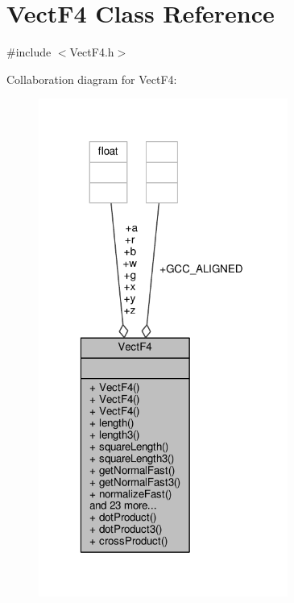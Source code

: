 \hypertarget{classVectF4}{\section{Vect\-F4 Class Reference}
\label{classVectF4}
}


{\ttfamily \#include $<$Vect\-F4.\-h$>$}



Collaboration diagram for Vect\-F4\-:
\nopagebreak
\begin{figure}[H]
\begin{center}
\leavevmode
\includegraphics[width=232pt]{classVectF4__coll__graph}
\end{center}
\end{figure}

